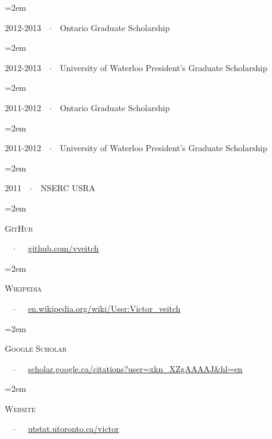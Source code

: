 \documentclass{scrartcl}
\newcommand{\MarginText}[1]{\marginpar{\raggedleft\itshape\small#1}} %
\newcommand{\Description}[1]{\hangindent=2em\hangafter=0\noindent\raggedright\footnotesize{#1}\par\normalsize\vspace{1em}} %
\begin{document}
\begin{cv}{}
\vspace{-0.5em} %

\Description{2012-2013\ \ $\cdotp$\ \ Ontario Graduate Scholarship}


\vspace{-0.5em} %

\Description{2012-2013\ \ $\cdotp$\ \ University of Waterloo President's Graduate Scholarship}


\vspace{-0.5em} %

\Description{2011-2012\ \ $\cdotp$\ \ Ontario Graduate Scholarship}


\vspace{-0.5em} %

\Description{2011-2012\ \ $\cdotp$\ \ University of Waterloo President's Graduate Scholarship}

\vspace{-0.5em} %

\Description{2011\ \ $\cdotp$\ \ NSERC USRA}

\newpage
\vspace{1em}

\newlength{\langbox} %
\settowidth{\langbox}{google scholar} %

\Description{\MarginText{Web}\parbox{\langbox}{\textsc{GitHub}}\ \ $\cdotp$\ \ \ \href{https://github.com/vveitch}{github.com/vveitch}}
\Description{\parbox{\langbox}{\textsc{Wikipedia}}\ \ $\cdotp$\ \ \ \href{https://en.wikipedia.org/wiki/User:Victor_veitch}{en.wikipedia.org/wiki/User:Victor\_veitch}}
\Description{\parbox{\langbox}{\textsc{Google Scholar}}\ \ $\cdotp$\ \ \ \href{https://scholar.google.ca/citations?user=xkn_XZgAAAAJ&hl=en}{scholar.google.ca/citations?user=xkn\_XZgAAAAJ\&hl=en}}
\Description{\parbox{\langbox}{\textsc{Website}}\ \ $\cdotp$\ \ \ \href{https://utstat.utoronto.ca/~victor}{utstat.utoronto.ca/\texttildelow victor}}
\end{cv}
\end{document}

